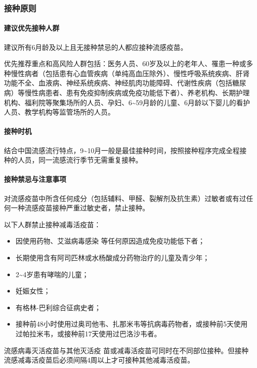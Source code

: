 \documentclass[9pt,a4paper,twoside]{rho-class/rho}
\begin{document}
    \subsubsection{接种原则}

    \paragraph{建议优先接种人群}
    建议所有6月龄及以上且无接种禁忌的人都应接种流感疫苗。
    
    优先推荐重点和高风险人群包括：医务人员、60岁及以上的老年人、罹患一种或多种慢性病者（包括患有心血管疾病（单纯高血压除外）、慢性呼吸系统疾病、肝肾功能不全、血液病、神经系统疾病、神经肌肉功能障碍、代谢性疾病（包括糖尿病）等慢性病患者、患有免疫抑制疾病或免疫功能低下者）、养老机构、长期护理机构、福利院等聚集场所的人员、孕妇、6\textasciitilde59月龄的儿童、6月龄以下婴儿的看护人员、教学机构等监管场所的人员。
    
    \paragraph{接种时机}
    结合中国流感流行特点，9\textasciitilde10月一般是最佳接种时间，按照接种程序完成全程接种的人员，同一流感流行季节无需重复接种。
    
    \paragraph{接种禁忌与注意事项}
    对流感疫苗中所含任何成分（包括辅料、甲醛、裂解剂及抗生素）过敏者或有过任何一种流感疫苗接种严重过敏史者，禁止接种。
    
    以下人群禁止接种减毒活疫苗：
    
    \begin{itemize}
        \item 因使用药物、艾滋病毒感染 等任何原因造成免疫功能低下者；
        \item 长期使用含有阿司匹林或水杨酸成分药物治疗的儿童及青少年；
        \item 2\textasciitilde4岁患有哮喘的儿童；
        \item 妊娠女性；
        \item 有格林-巴利综合征病史者；
        \item 接种前48小时使用过奥司他韦、扎那米韦等抗病毒药物者，或接种前5天使用过帕拉米韦，或接种前17天使用过巴洛沙韦者。
    \end{itemize}
    
    流感病毒灭活疫苗与其他灭活疫 苗或减毒活疫苗可同时在不同部位接种。但接种流感减毒活疫苗后必须间隔4周以上才可接种其他减毒活疫苗。
    
\end{document}
